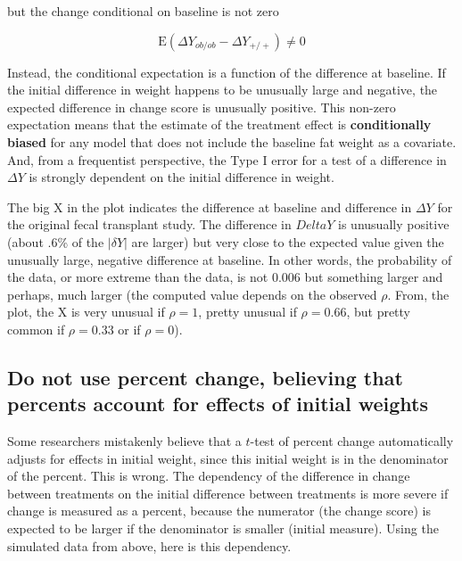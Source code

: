 \documentclass[]{book}
\begin{document}
but the change conditional on baseline is not zero

\begin{equation}
\mathrm{E}(\Delta Y_{ob/ob} - \Delta Y_{+/+}) \ne 0
\end{equation}

Instead, the conditional expectation is a function of the difference at baseline. If the initial difference in weight happens to be unusually large and negative, the expected difference in change score is unusually positive. This non-zero expectation means that the estimate of the treatment effect is \textbf{conditionally biased} for any model that does not include the baseline fat weight as a covariate. And, from a frequentist perspective, the Type I error for a test of a difference in \(\Delta Y\) is strongly dependent on the initial difference in weight.

The big X in the plot indicates the difference at baseline and difference in \(\Delta Y\) for the original fecal transplant study. The difference in \(Delta Y\) is unusually positive (about .6\% of the \(|\delta Y|\) are larger) but very close to the expected value given the unusually large, negative difference at baseline. In other words, the probability of the data, or more extreme than the data, is not 0.006 but something larger and perhaps, much larger (the computed value depends on the observed \(\rho\). From, the plot, the X is very unusual if \(\rho=1\), pretty unusual if \(\rho=0.66\), but pretty common if \(\rho=0.33\) or if \(\rho=0\)).

\hypertarget{do-not-use-percent-change-believing-that-percents-account-for-effects-of-initial-weights}{%
\subsection{Do not use percent change, believing that percents account for effects of initial weights}\label{do-not-use-percent-change-believing-that-percents-account-for-effects-of-initial-weights}}

Some researchers mistakenly believe that a \(t\)-test of percent change automatically adjusts for effects in initial weight, since this initial weight is in the denominator of the percent. This is wrong. The dependency of the difference in change between treatments on the initial difference between treatments is more severe if change is measured as a percent, because the numerator (the change score) is expected to be larger if the denominator is smaller (initial measure). Using the simulated data from above, here is this dependency.
\end{document}
